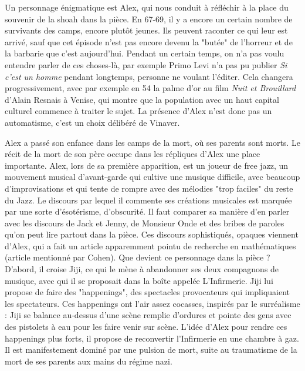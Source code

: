 \documentclass[a4paper,12pt]{book}
\begin{document}
\par Un personnage énigmatique est Alex, qui nous conduit à réfléchir à la place du souvenir de la shoah dans la pièce. En 67-69, il y a encore un certain nombre de survivants des camps, encore plutôt jeunes. Ils peuvent raconter ce qui leur est arrivé, sauf que cet épisode n'est pas encore devenu la "butée" de l'horreur et de la barbarie que c'est aujourd'hui. Pendant un certain temps, on n'a pas voulu entendre parler de ces choses-là, par exemple Primo Levi n'a pas pu publier \textit{Si c'est un homme} pendant longtemps, personne ne voulant l'éditer. Cela changera progressivement, avec par exemple en 54 la palme d'or au film \textit{Nuit et Brouillard} d'Alain Resnais à Venise, qui montre que la population avec un haut capital culturel commence à traiter le sujet. La présence d'Alex n'est donc pas un automatisme, c'est un choix délibéré de Vinaver.
\par Alex a passé son enfance dans les camps de la mort, où ses parents sont morts. Le récit de la mort de son père occupe dans les répliques d'Alex une place importante. Alex, lors de sa première apparition, est un joueur de free jazz, un mouvement musical d'avant-garde qui cultive une musique difficile, avec beaucoup d'improvisations et qui tente de rompre avec des mélodies "trop faciles" du reste du Jazz. Le discours par lequel il commente ses créations musicales est marquée par une sorte d'ésotérisme, d'obscurité. Il faut comparer sa manière d'en parler avec les discours de Jack et Jenny, de Monsieur Onde et des bribes de paroles qu'on peut lire partout dans la pièce. Ces discours sophistiqués, opaques viennent d'Alex, qui a fait un article apparemment pointu de recherche en mathématiques (article mentionné par Cohen). Que devient ce personnage dans la pièce ? D'abord, il croise Jiji, ce qui le mène à abandonner ses deux compagnons de musique, avec qui il se proposait dans la boîte appelée L'Infirmerie. Jiji lui propose de faire des "happenings", des spectacles provocateurs qui impliquaient les spectateurs. Ces happenings ont l'air assez cocasses, inspirés par le surréalisme : Jiji se balance au-dessus d'une scène remplie d'ordures et pointe des gens avec des pistolets à eau pour les faire venir sur scène. L'idée d'Alex pour rendre ces happenings plus forts, il propose de reconvertir l'Infirmerie en une chambre à gaz. Il est manifestement dominé par une pulsion de mort, suite au traumatisme de la mort de ses parents aux mains du régime nazi.
\end{document}
